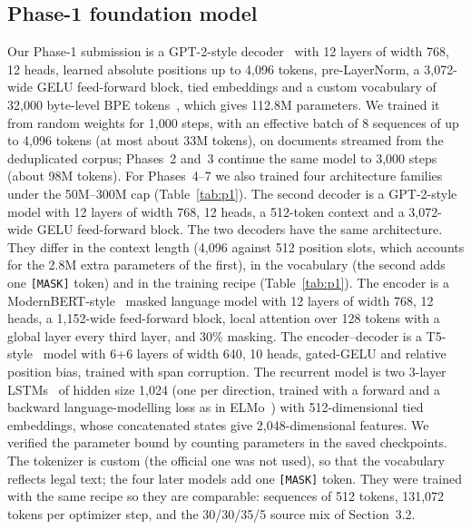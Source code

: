\documentclass[10pt,a4paper]{article}
\begin{document}
\subsection{Phase-1 foundation model}
Our Phase-1 submission is a GPT-2-style decoder~\cite{gpt2} with 12 layers of width 768, 12 heads, learned absolute positions up to 4{,}096 tokens, pre-LayerNorm, a 3{,}072-wide GELU feed-forward block, tied embeddings and a custom vocabulary of 32{,}000 byte-level BPE tokens~\cite{bpe}, which gives 112.8M parameters. We trained it from random weights for 1{,}000 steps, with an effective batch of 8 sequences of up to 4{,}096 tokens (at most about 33M tokens), on documents streamed from the deduplicated corpus; Phases~2 and~3 continue the same model to 3{,}000 steps (about 98M tokens). For Phases~4--7 we also trained four architecture families under the 50M--300M cap (Table~\ref{tab:p1}). The second decoder is a GPT-2-style model with 12 layers of width 768, 12 heads, a 512-token context and a 3{,}072-wide GELU feed-forward block. The two decoders have the same architecture. They differ in the context length (4{,}096 against 512 position slots, which accounts for the 2.8M extra parameters of the first), in the vocabulary (the second adds one \texttt{[MASK]} token) and in the training recipe (Table~\ref{tab:p1}). The encoder is a ModernBERT-style~\cite{modernbert} masked language model with 12 layers of width 768, 12 heads, a 1{,}152-wide feed-forward block, local attention over 128 tokens with a global layer every third layer, and 30\% masking. The encoder--decoder is a T5-style~\cite{t5} model with 6+6 layers of width 640, 10 heads, gated-GELU and relative position bias, trained with span corruption. The recurrent model is two 3-layer LSTMs~\cite{lstm} of hidden size 1{,}024 (one per direction, trained with a forward and a backward language-modelling loss as in ELMo~\cite{elmo}) with 512-dimensional tied embeddings, whose concatenated states give 2{,}048-dimensional features. We verified the parameter bound by counting parameters in the saved checkpoints. The tokenizer is custom (the official one was not used), so that the vocabulary reflects legal text; the four later models add one \texttt{[MASK]} token. They were trained with the same recipe so they are comparable: sequences of 512 tokens, 131{,}072 tokens per optimizer step, and the 30/30/35/5 source mix of Section~3.2.
\end{document}
